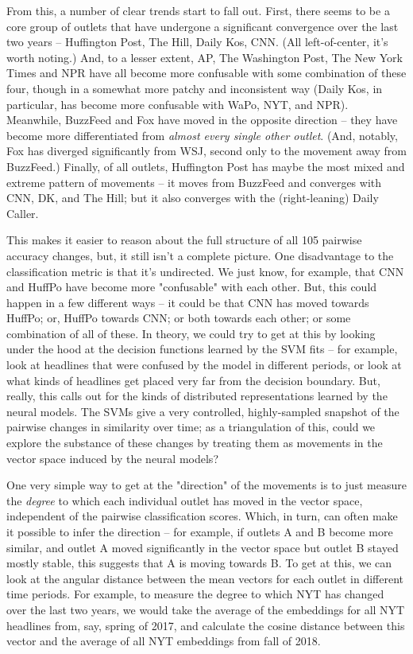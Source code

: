 \documentclass{scrartcl}
\begin{document}

From this, a number of clear trends start to fall out. First, there seems to be a core group of outlets that have undergone a significant convergence over the last two years -- Huffington Post, The Hill, Daily Kos, CNN. (All left-of-center, it's worth noting.) And, to a lesser extent, AP, The Washington Post, The New York Times and NPR have all become more confusable with some combination of these four, though in a somewhat more patchy and inconsistent way (Daily Kos, in particular, has become more confusable with WaPo, NYT, and NPR). Meanwhile, BuzzFeed and Fox have moved in the opposite direction -- they have become more differentiated from \textit{almost every single other outlet}. (And, notably, Fox has diverged significantly from WSJ, second only to the movement away from BuzzFeed.) Finally, of all outlets, Huffington Post has maybe the most mixed and extreme pattern of movements -- it moves from BuzzFeed and converges with CNN, DK, and The Hill; but it also converges with the (right-leaning) Daily Caller.

This makes it easier to reason about the full structure of all 105 pairwise accuracy changes, but, it still isn't a complete picture. One disadvantage to the classification metric is that it's undirected. We just know, for example, that CNN and HuffPo have become more "confusable" with each other. But, this could happen in a few different ways -- it could be that CNN has moved towards HuffPo; or, HuffPo towards CNN; or both towards each other; or some combination of all of these. In theory, we could try to get at this by looking under the hood at the decision functions learned by the SVM fits -- for example, look at headlines that were confused by the model in different periods, or look at what kinds of headlines get placed very far from the decision boundary. But, really, this calls out for the kinds of distributed representations learned by the neural models. The SVMs give a very controlled, highly-sampled snapshot of the pairwise changes in similarity over time; as a triangulation of this, could we explore the substance of these changes by treating them as movements in the vector space induced by the neural models?

One very simple way to get at the "direction" of the movements is to just measure the \textit{degree} to which each individual outlet has moved in the vector space, independent of the pairwise classification scores. Which, in turn, can often make it possible to infer the direction -- for example, if outlets A and B become more similar, and outlet A moved significantly in the vector space but outlet B stayed mostly stable, this suggests that A is moving towards B. To get at this, we can look at the angular distance between the mean vectors for each outlet in different time periods. For example, to measure the degree to which NYT has changed over the last two years, we would take the average of the embeddings for all NYT headlines from, say, spring of 2017, and calculate the cosine distance between this vector and the average of all NYT embeddings from fall of 2018.
\end{document}
